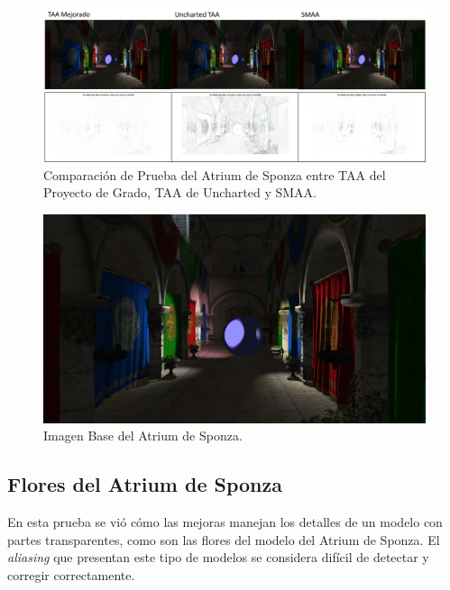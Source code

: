 \documentclass[pregrado]{tesis-usb} %
\begin{document}
\begin{figure}[!htb]
	\centering
	\includegraphics[scale=0.3]{images/results/sponza.png}
	\caption{Comparación de Prueba del Atrium de Sponza entre TAA del Proyecto de Grado, TAA de Uncharted y SMAA.}\label{fig:sponza_render}
\end{figure}

\begin{figure}[!htb]
	\centering
	\includegraphics[scale=0.1]{images/results/sponza_sobel_ground_truth.png}
	\caption{Imagen Base del Atrium de Sponza.}\label{fig:sponza_truth}
\end{figure}

\FloatBarrier

\subsection{Flores del Atrium de Sponza}
En esta prueba se vió cómo las mejoras manejan los detalles de un modelo con partes transparentes, como son las flores del modelo del Atrium de Sponza. El \textit{aliasing} que presentan este tipo de modelos se considera difícil de detectar y corregir correctamente. 
\end{document}
